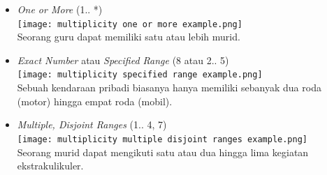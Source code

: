 \documentclass[a4paper]{article}
\begin{document}
\begin{enumerate}
\begin{itemize}
        \item \textit{One or More} (1.. *)\\
            \texttt{[image: multiplicity one or more example.png]}\\
            Seorang guru dapat memiliki satu atau lebih murid.
        \item \textit{Exact Number} atau \textit{Specified Range} (8 atau 2.. 5)\\
            \texttt{[image: multiplicity specified range example.png]}\\
            Sebuah kendaraan pribadi biasanya hanya memiliki sebanyak dua roda (motor) hingga empat roda (mobil).
        \item \textit{Multiple, Disjoint Ranges} (1.. 4, 7)\\
            \texttt{[image: multiplicity multiple disjoint ranges example.png]}\\
            Seorang murid dapat mengikuti satu atau dua hingga lima kegiatan ekstrakulikuler.
    \end{itemize}


\end{enumerate}
\end{document}
